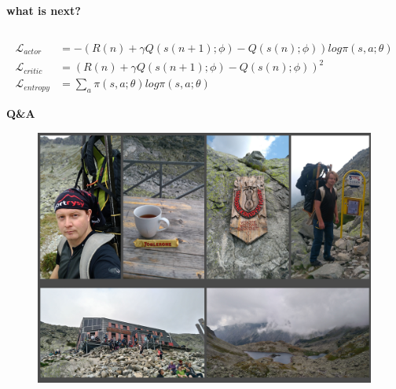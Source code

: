 \documentclass[xcolor=dvipsnames]{beamer}
\begin{document}
\begin{frame}{\bf what is next?}
\begin{columns}
\begin{column}{0.7\textwidth}
      

  \end{column}

\end{columns}


\begin{align*}
\mathcal{L}_{actor}&= -\left( R(n) + \gamma Q(s(n+1); \phi) - Q(s(n); \phi)  \right) log \pi(s, a; \theta) \\
\mathcal{L}_{critic}&= \left( R(n) + \gamma Q(s(n+1); \phi) - Q(s(n); \phi)  \right)^2 \\
\mathcal{L}_{entropy}&= \sum_a \pi(s, a; \theta) log \pi(s, a; \theta)
\end{align*}


\end{frame}



\begin{frame}{\bf Q\&A}

\begin{figure}
  \includegraphics[scale=0.4]{../images/me_rysy.jpg}
\end{figure}



\end{frame}
\end{document}
